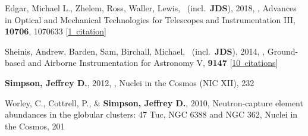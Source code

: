 \item[{\color{numcolor}\scriptsize4}] Edgar, Michael L., Zhelem, Ross, Waller, Lewis, \etal\ (incl.\ \textbf{JDS}), 2018, , Advances in Optical and Mechanical Technologies for Telescopes and Instrumentation III, \textbf{10706}, 1070633 [\href{https://ui.adsabs.harvard.edu/#abs/2018SPIE10706E..33E}{1~citation}]

\item[{\color{numcolor}\scriptsize3}] Sheinis, Andrew, Barden, Sam, Birchall, Michael, \etal\ (incl.\ \textbf{JDS}), 2014, , Ground-based and Airborne Instrumentation for Astronomy V, \textbf{9147} [\href{https://ui.adsabs.harvard.edu/#abs/2014SPIE.9147E..0YS}{10~citations}]

\item[{\color{numcolor}\scriptsize2}] \textbf{Simpson, Jeffrey D.}, 2012, , Nuclei in the Cosmos (NIC XII), 232

\item[{\color{numcolor}\scriptsize1}] Worley, C., Cottrell, P., \& \textbf{Simpson, Jeffrey D.}, 2010, Neutron-capture element abundances in the globular clusters: 47 Tuc, NGC 6388 and NGC 362, Nuclei in the Cosmos, 201